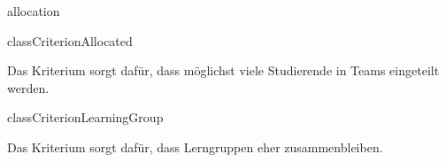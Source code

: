 \begin{texdocpackage}{allocation}
\begin{texdocclass}{class}{CriterionAllocated}
\label{texdoclet:allocation.CriterionAllocated}
\begin{texdocclassintro}
Das Kriterium sorgt dafür, dass möglichst viele Studierende in Teams
 eingeteilt werden.\end{texdocclassintro}
\begin{texdocclassconstructors}
\end{texdocclassconstructors}
\begin{texdocclassmethods}
\end{texdocclassmethods}
\end{texdocclass}


\begin{texdocclass}{class}{CriterionLearningGroup}
\label{texdoclet:allocation.CriterionLearningGroup}
\begin{texdocclassintro}
Das Kriterium sorgt dafür, dass Lerngruppen eher zusammenbleiben.\end{texdocclassintro}
\begin{texdocclassconstructors}
\end{texdocclassconstructors}
\begin{texdocclassmethods}
\end{texdocclassmethods}
\end{texdocclass}



\end{texdocpackage}
